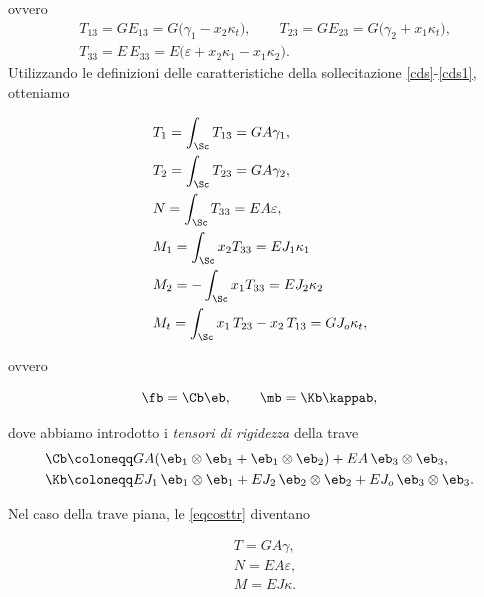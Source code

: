 ovvero
\begin{equation}
	\begin{aligned}
&T_{13}=G E_{13}=G \big(\gamma_1-x_2\kappa_t \big), \qquad T_{23}=G E_{23}=G\big(\gamma_2+x_1\kappa_t \big), \\ 
&T_{33}=E\,E_{33}=E \big(\varepsilon+x_2\kappa_1-x_1\kappa_2\big).
	\end{aligned}
\end{equation}
Utilizzando le definizioni delle caratteristiche della sollecitazione \eqref{cds}-\eqref{cds1}, otteniamo
\begin{definition}
	\begin{equation}\label{eqcosttr}
\begin{aligned}
&T_1=\int_{\Sc}T_{13}=G A\gamma_1,\\
&T_2=\int_{\Sc}T_{23}=G A\gamma_2,\\
&N=\int_{\Sc}T_{33}=EA \varepsilon,\\
&M_1=\int_{\Sc} x_2 T_{33}=  EJ_1\kappa_1  \\
&M_2= -\int_{\Sc}x_1 T_{33}= EJ_2 \kappa_2  \\
&M_t=\int_\Sc x_1\,T_{23}-x_2\,T_{13}=GJ_o \kappa_t,
\end{aligned}
\end{equation}
\end{definition}
ovvero
\begin{definition}
	\begin{equation}
\fb =\Cb \eb, \qquad \mb =\Kb \kappab,
\end{equation}
\end{definition}
dove abbiamo introdotto i \textit{tensori di rigidezza} della trave
\begin{equation}
\begin{aligned}
	&\Cb\coloneqq GA(\eb_1\otimes\eb_1+\eb_1\otimes\eb_2)+EA\,\eb_3\otimes\eb_3,\\
	&\Kb\coloneqq EJ_1\, \eb_1\otimes\eb_1+EJ_2\, \eb_2\otimes\eb_2+EJ_o\,\eb_3\otimes\eb_3.
\end{aligned}
\end{equation}

Nel caso della trave piana, le \eqref{eqcosttr} diventano

\begin{definition}
	\begin{equation}\label{eqcosttrp}
		\begin{aligned}
			&T=G A\gamma,\\
			&N=EA \varepsilon,\\
			&M=  EJ\kappa.
			\end{aligned}
	\end{equation}
\end{definition}

